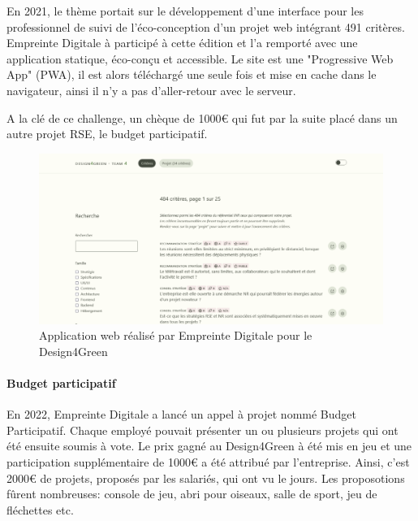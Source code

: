 \documentclass[12pt]{article}
\begin{document}
En 2021, le thème portait sur le développement d'une interface pour les professionnel de suivi de l'éco-conception d'un projet web intégrant 491 critères.
Empreinte Digitale à participé à cette édition et l'a remporté avec une application statique, éco-conçu et accessible.
Le site est une "Progressive Web App" (\gls{PWA}), il est alors téléchargé une seule fois et mise en cache dans le navigateur, ainsi il n'y a pas d'aller-retour avec le serveur.

A la clé de ce challenge, un chèque de 1000€ qui fut par la suite placé dans un autre projet \gls{RSE}, le budget participatif.

\begin{figure}[!ht]
    \centering
    \includegraphics[width=\textwidth]{src/interface_d4g.png}
    \caption{Application web réalisé par Empreinte Digitale pour le Design4Green}
    \label{fig:design4greenl}
\end{figure}

\paragraph{Budget participatif}
En 2022, Empreinte Digitale a lancé un appel à projet nommé Budget Participatif. 
Chaque employé pouvait présenter un ou plusieurs projets qui ont été ensuite soumis à vote. 
Le prix gagné au Design4Green à été mis en jeu et une participation supplémentaire de 1000€ a été attribué par l'entreprise. 
Ainsi, c'est 2000€ de projets, proposés par les salariés, qui ont vu le jours. 
Les proposotions fûrent nombreuses: console de jeu, abri pour oiseaux, salle de sport, jeu de fléchettes etc.
\end{document}
